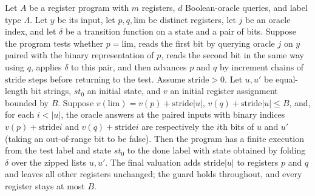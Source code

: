 \begin{theorem}
\label{Complexity.Codec.scan_loop}
\leanok
{}
Let $A$ be a register program with $m$ registers, $d$ Boolean-oracle queries, and label
type $\Lambda$. Let $y$ be its input, let $p,q,\mathrm{lim}$ be distinct registers, let
$j$ be an oracle index, and let $\delta$ be a transition function on a state and a pair
of bits. Suppose the program tests whether $p=\mathrm{lim}$, reads the first bit by
querying oracle $j$ on $y$ paired with the binary representation of $p$, reads the
second bit in the same way using $q$, applies $\delta$ to this pair, and then advances
$p$ and $q$ by increment chains of $\mathrm{stride}$ steps before returning to the test.
Assume $\mathrm{stride}>0$. Let $u,u\prime$ be equal-length bit strings, $st_0$ an
initial state, and $v$ an initial register assignment bounded by $B$. Suppose
$v(\mathrm{lim})=v(p)+\mathrm{stride}|u|$, $v(q)+\mathrm{stride}|u|\le B$, and, for each
$i<|u|$, the oracle answers at the paired inputs with binary indices
$v(p)+\mathrm{stride}i$ and $v(q)+\mathrm{stride}i$ are respectively the $i$th bits of
$u$ and $u\prime$ (taking an out-of-range bit to be false). Then the program has a
finite execution from the test label and state $st_0$ to the done label with state
obtained by folding $\delta$ over the zipped lists $u,u\prime$. The final valuation
adds $\mathrm{stride}|u|$ to registers $p$ and $q$ and leaves all other registers
unchanged; the guard holds throughout, and every register stays at most $B$.
\end{theorem}

